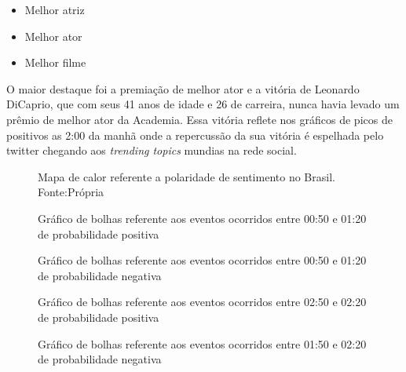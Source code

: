  \begin{itemize}
 	\item Melhor atriz
 	\item Melhor ator
 	\item Melhor filme
 \end{itemize}

O maior destaque foi a premiação de melhor ator e a vitória de Leonardo DiCaprio, que com seus 41 anos de idade e 26 de carreira, nunca havia levado um prêmio de melhor ator da Academia. Essa vitória reflete nos gráficos de picos de positivos as 2:00 da manhã onde a repercussão da sua vitória é espelhada pelo twitter chegando aos \textit{trending topics} mundias na rede social.


\begin{figure}[H]
	\centering{}
	\caption{Mapa de calor referente a polaridade de sentimento no Brasil. Fonte:Própria}
	\label{mapa}
\end{figure}

\begin{figure}[H]
	\centering{}
	\caption{Gráfico de bolhas referente aos eventos ocorridos entre 00:50 e 01:20 de probabilidade positiva}
	\label{pos1}
\end{figure}

\begin{figure}[H]
	\centering{}
	\caption{Gráfico de bolhas referente aos eventos ocorridos entre 00:50 e 01:20 de probabilidade negativa}
	\label{neg1}
\end{figure}


\begin{figure}[H]
	\centering{}
	\caption{Gráfico de bolhas referente aos eventos ocorridos entre 02:50 e 02:20 de probabilidade positiva}
	\label{pos1}
\end{figure}

\begin{figure}[H]
	\centering{}
	\caption{Gráfico de bolhas referente aos eventos ocorridos entre 01:50 e 02:20 de probabilidade negativa}
	\label{neg1}
\end{figure}